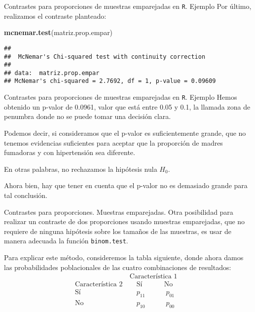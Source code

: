 \documentclass[
  ignorenonframetext,
]{beamer}
\newenvironment{Shaded}{\begin{snugshade}}{\end{snugshade}}
\newcommand{\KeywordTok}[1]{\textcolor[rgb]{0.13,0.29,0.53}{\textbf{#1}}}
\newcommand{\NormalTok}[1]{#1}
\begin{document}
\begin{frame}[fragile]{Contrastes para proporciones de muestras
emparejadas en \texttt{R}. Ejemplo}
\protect\hypertarget{contrastes-para-proporciones-de-muestras-emparejadas-en-r.-ejemplo-3}{}
Por último, realizamos el contraste planteado:

\begin{Shaded}
\begin{Highlighting}[]
\KeywordTok{mcnemar.test}\NormalTok{(matriz.prop.empar)}
\end{Highlighting}
\end{Shaded}

\begin{verbatim}
## 
##  McNemar's Chi-squared test with continuity correction
## 
## data:  matriz.prop.empar
## McNemar's chi-squared = 2.7692, df = 1, p-value = 0.09609
\end{verbatim}
\end{frame}

\begin{frame}{Contrastes para proporciones de muestras emparejadas en
\texttt{R}. Ejemplo}
\protect\hypertarget{contrastes-para-proporciones-de-muestras-emparejadas-en-r.-ejemplo-4}{}
Hemos obtenido un p-valor de 0.0961, valor que está entre 0.05 y 0.1, la
llamada zona de penumbra donde no se puede tomar una decisión clara.

Podemos decir, si consideramos que el p-valor es suficientemente grande,
que no tenemos evidencias suficientes para aceptar que la proporción de
madres fumadoras y con hipertensión sea diferente.

En otras palabras, no rechazamos la hipótesis nula \(H_0\).

Ahora bien, hay que tener en cuenta que el p-valor no es demasiado
grande para tal conclusión.
\end{frame}

\begin{frame}[fragile]{Contrastes para proporciones. Muestras
emparejadas.}
\protect\hypertarget{contrastes-para-proporciones.-muestras-emparejadas.}{}
Otra posibilidad para realizar un contraste de dos proporciones usando
muestras emparejadas, que no requiere de ninguna hipótesis sobre los
tamaños de las muestras, es usar de manera adecuada la función
\texttt{binom.test}.

Para explicar este método, consideremos la tabla siguiente, donde ahora
damos las probabilidades poblacionales de las cuatro combinaciones de
resultados: \[
\begin{array}{r|c}
 & \ \mbox{Característica 1}\  \\
\mbox{Característica 2} &\quad \ \!\mbox{Sí}\qquad\quad\, \mbox{No}\quad \\\hline
 \mbox{Sí} & \quad \  p_{11}  \qquad\quad p_{01}\quad  \\
 \mbox{No} & \quad \  p_{10} \qquad\quad  p_{00}\quad
 \end{array}
\]
\end{frame}
\end{document}

